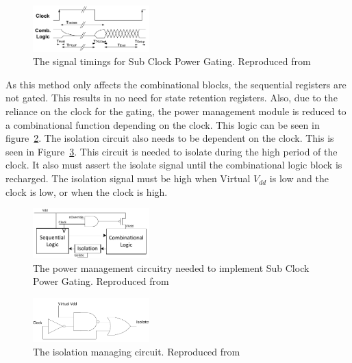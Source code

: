 \begin{figure}
\includegraphics[width=0.4\textwidth]{Figures/scpg_timings.png}
\caption{The signal timings for Sub Clock Power Gating. Reproduced from \cite{mistry2011sub}}
\label{fig:scpg:timing}
\end{figure}


As this method only affects the combinational blocks, the sequential registers are not gated.
This results in no need for state retention registers.
Also, due to the reliance on the clock for the gating, the power management module is reduced to a combinational function depending on the clock. 
This logic can be seen in figure~\ref{fig:scpg:gate}. 
The isolation circuit also needs to be dependent on the clock.
This is seen in Figure~\ref{fig:scpg:iso}.
This circuit is needed to isolate during the high period of the clock. 
It also must assert the isolate signal until the combinational logic block is recharged. 
The isolation signal must be high when Virtual $V_{dd}$ is low and the clock is low, or when the clock is high. 

\begin{figure}
\includegraphics[width=0.4\textwidth]{Figures/mistry_gating.pdf}%
\caption{The power management circuitry needed to implement Sub Clock Power Gating. Reproduced from \cite{mistry2011sub}}
\label{fig:scpg:gate}
\end{figure}
\begin{figure}
\includegraphics[width=0.4\textwidth]{Figures/mistry_isolation.pdf}%
\caption{The isolation managing circuit. Reproduced from \cite{mistry2011sub}}
\label{fig:scpg:iso}
\end{figure}

